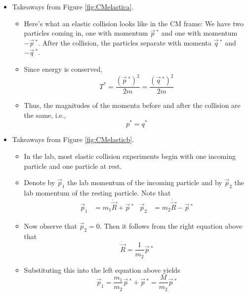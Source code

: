 \documentclass[../notes.tex]{subfiles}
\begin{document}
\begin{itemize}
\begin{itemize}
\begin{itemize}
        \end{itemize}
        \item Takeaways from Figure \ref{fig:CMelastica}.
        \begin{itemize}
            \item Here's what an elastic collision looks like in the CM frame: We have two particles coming in, one with momentum $\vec{p}{\,}^*$ and one with momentum $-\vec{p}{\,}^*$. After the collision, the particles separate with momenta $\vec{q}{\,}^*$ and $-\vec{q}{\,}^*$.
            \item Since energy is conserved,
            \begin{equation*}
                T^* = \frac{(\vec{p}{\,}^*)^2}{2m} = \frac{(\vec{q}{\,}^*)^2}{2m}
            \end{equation*}
            \item Thus, the magnitudes of the momenta before and after the collision are the same, i.e.,
            \begin{equation*}
                p^* = q^*
            \end{equation*}
        \end{itemize}
        \item Takeaways from Figure \ref{fig:CMelasticb}.
        \begin{itemize}
            \item In the lab, most elastic collision experiments begin with one incoming particle and one particle at rest.
            \item Denote by $\vec{p}_1$ the lab momentum of the incoming particle and by $\vec{p}_2$ the lab momentum of the resting particle. Note that
            \begin{align*}
                \vec{p}_1 &= m_1\dot{\vec{R}}+\vec{p}{\,}^*&
                \vec{p}_2 &= m_2\dot{\vec{R}}-\vec{p}{\,}^*
            \end{align*}
            \item Now observe that $\vec{p}_2=0$. Then it follows from the right equation above that
            \begin{equation*}
                \dot{\vec{R}} = \frac{1}{m_2}\vec{p}{\,}^*
            \end{equation*}
            \item Substituting this into the left equation above yields
            \begin{equation*}
                \vec{p}_1 = \frac{m_1}{m_2}\vec{p}{\,}^*+\vec{p}{\,}^* = \frac{M}{m_2}\vec{p}{\,}^*

\end{equation*}
\end{itemize}
\end{itemize}
\end{itemize}
\end{document}
